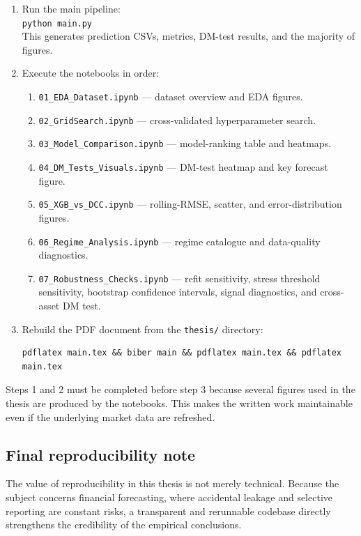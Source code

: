 \begin{enumerate}
    \item Run the main pipeline:\\
          \texttt{python main.py}\\
          This generates prediction CSVs, metrics, DM-test results, and the majority of figures.
    \item Execute the notebooks in order:
    \begin{enumerate}
        \item \texttt{01\_EDA\_Dataset.ipynb} --- dataset overview and EDA figures.
        \item \texttt{02\_GridSearch.ipynb} --- cross-validated hyperparameter search.
        \item \texttt{03\_Model\_Comparison.ipynb} --- model-ranking table and heatmaps.
        \item \texttt{04\_DM\_Tests\_Visuals.ipynb} --- DM-test heatmap and key forecast figure.
        \item \texttt{05\_XGB\_vs\_DCC.ipynb} --- rolling-RMSE, scatter, and error-distribution figures.
        \item \texttt{06\_Regime\_Analysis.ipynb} --- regime catalogue and data-quality diagnostics.
        \item \texttt{07\_Robustness\_Checks.ipynb} --- refit sensitivity, stress threshold sensitivity, bootstrap confidence intervals, signal diagnostics, and cross-asset DM test.
    \end{enumerate}
    \item Rebuild the PDF document from the \texttt{thesis/} directory:
\begin{lstlisting}[language={}]
pdflatex main.tex && biber main && pdflatex main.tex && pdflatex main.tex
\end{lstlisting}
\end{enumerate}

Steps 1 and 2 must be completed before step 3 because several figures used in the thesis are produced by the notebooks. This makes the written work maintainable even if the underlying market data are refreshed.

\subsection{Final reproducibility note}

The value of reproducibility in this thesis is not merely technical. Because the subject concerns financial forecasting, where accidental leakage and selective reporting are constant risks, a transparent and rerunnable codebase directly strengthens the credibility of the empirical conclusions.

